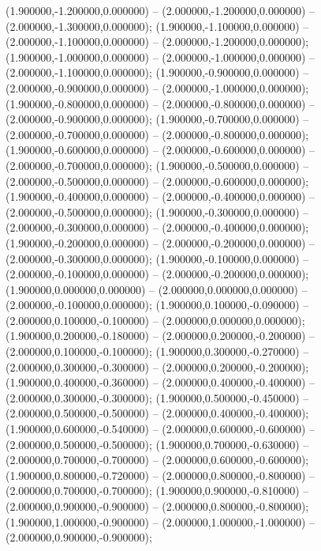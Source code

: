  (1.900000,-1.200000,0.000000) -- (2.000000,-1.200000,0.000000) -- (2.000000,-1.300000,0.000000);
 (1.900000,-1.100000,0.000000) -- (2.000000,-1.100000,0.000000) -- (2.000000,-1.200000,0.000000);
 (1.900000,-1.000000,0.000000) -- (2.000000,-1.000000,0.000000) -- (2.000000,-1.100000,0.000000);
 (1.900000,-0.900000,0.000000) -- (2.000000,-0.900000,0.000000) -- (2.000000,-1.000000,0.000000);
 (1.900000,-0.800000,0.000000) -- (2.000000,-0.800000,0.000000) -- (2.000000,-0.900000,0.000000);
 (1.900000,-0.700000,0.000000) -- (2.000000,-0.700000,0.000000) -- (2.000000,-0.800000,0.000000);
 (1.900000,-0.600000,0.000000) -- (2.000000,-0.600000,0.000000) -- (2.000000,-0.700000,0.000000);
 (1.900000,-0.500000,0.000000) -- (2.000000,-0.500000,0.000000) -- (2.000000,-0.600000,0.000000);
 (1.900000,-0.400000,0.000000) -- (2.000000,-0.400000,0.000000) -- (2.000000,-0.500000,0.000000);
 (1.900000,-0.300000,0.000000) -- (2.000000,-0.300000,0.000000) -- (2.000000,-0.400000,0.000000);
 (1.900000,-0.200000,0.000000) -- (2.000000,-0.200000,0.000000) -- (2.000000,-0.300000,0.000000);
 (1.900000,-0.100000,0.000000) -- (2.000000,-0.100000,0.000000) -- (2.000000,-0.200000,0.000000);
 (1.900000,0.000000,0.000000) -- (2.000000,0.000000,0.000000) -- (2.000000,-0.100000,0.000000);
 (1.900000,0.100000,-0.090000) -- (2.000000,0.100000,-0.100000) -- (2.000000,0.000000,0.000000);
 (1.900000,0.200000,-0.180000) -- (2.000000,0.200000,-0.200000) -- (2.000000,0.100000,-0.100000);
 (1.900000,0.300000,-0.270000) -- (2.000000,0.300000,-0.300000) -- (2.000000,0.200000,-0.200000);
 (1.900000,0.400000,-0.360000) -- (2.000000,0.400000,-0.400000) -- (2.000000,0.300000,-0.300000);
 (1.900000,0.500000,-0.450000) -- (2.000000,0.500000,-0.500000) -- (2.000000,0.400000,-0.400000);
 (1.900000,0.600000,-0.540000) -- (2.000000,0.600000,-0.600000) -- (2.000000,0.500000,-0.500000);
 (1.900000,0.700000,-0.630000) -- (2.000000,0.700000,-0.700000) -- (2.000000,0.600000,-0.600000);
 (1.900000,0.800000,-0.720000) -- (2.000000,0.800000,-0.800000) -- (2.000000,0.700000,-0.700000);
 (1.900000,0.900000,-0.810000) -- (2.000000,0.900000,-0.900000) -- (2.000000,0.800000,-0.800000);
 (1.900000,1.000000,-0.900000) -- (2.000000,1.000000,-1.000000) -- (2.000000,0.900000,-0.900000);
